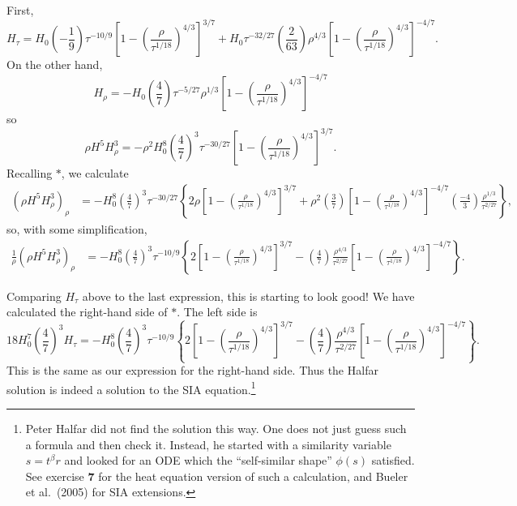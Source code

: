 \documentclass[10pt]{amsart}
\begin{document}
First,
    $$H_\tau = H_0 \left(-\frac{1}{9}\right) \tau^{-10/9} \left[1 - \left( \frac{\rho}{\tau^{1/18}} \right)^{4/3}\right]^{3/7} + H_0 \tau^{-32/27} \left(\frac{2}{63}\right) \rho^{4/3}  \left[1 - \left( \frac{\rho}{\tau^{1/18}} \right)^{4/3}\right]^{-4/7}.$$
On the other hand,
    $$H_\rho = - H_0 \left(\frac{4}{7}\right) \tau^{-5/27} \rho^{1/3} \left[1 - \left( \frac{\rho}{\tau^{1/18}} \right)^{4/3}\right]^{-4/7}$$
so
    $$\rho H^5 H_\rho^3 = -\rho^2 H_0^8 \left(\frac{4}{7}\right)^3 \tau^{-30/27} \left[1 - \left( \frac{\rho}{\tau^{1/18}} \right)^{4/3}\right]^{3/7}.$$
Recalling $\ast$, we calculate
\begin{align*}
\left(\rho H^5 H_\rho^3\right)_\rho &= - H_0^8 \left(\frac{4}{7}\right)^3 \tau^{-30/27} \left\{2 \rho \left[1 - \left( \frac{\rho}{\tau^{1/18}} \right)^{4/3}\right]^{3/7} + \rho^2 \left(\frac{3}{7}\right) \left[1 - \left( \frac{\rho}{\tau^{1/18}} \right)^{4/3}\right]^{-4/7}  \left(\frac{-4}{3}\right) \frac{\rho^{1/3}}{\tau^{2/27}}\right\},
\end{align*}
so, with some simplification,
\begin{align*}
\frac{1}{\rho} \left(\rho H^5 H_\rho^3\right)_\rho &= - H_0^8 \left(\frac{4}{7}\right)^3 \tau^{-10/9} \left\{ 2 \left[1 - \left( \frac{\rho}{\tau^{1/18}} \right)^{4/3}\right]^{3/7} - \left(\frac{4}{7}\right) \frac{\rho^{4/3}}{\tau^{2/27}} \left[1 - \left( \frac{\rho}{\tau^{1/18}} \right)^{4/3}\right]^{-4/7} \right\}.
\end{align*}

Comparing $H_\tau$ above to the last expression, this is starting to look good!  We have calculated the right-hand side of $\ast$.  The left side is
    $$18 H_0^7 \left(\frac{4}{7}\right)^3 H_\tau = - H_0^8 \left(\frac{4}{7}\right)^3 \tau^{-10/9} \left\{ 2 \left[1 - \left( \frac{\rho}{\tau^{1/18}} \right)^{4/3}\right]^{3/7} - \left(\frac{4}{7}\right) \frac{\rho^{4/3}}{\tau^{2/27}} \left[1 - \left( \frac{\rho}{\tau^{1/18}} \right)^{4/3}\right]^{-4/7} \right\}.$$
This is the same as our expression for the right-hand side.  Thus the Halfar solution is indeed a solution to the SIA equation.\footnote{Peter Halfar did not find the solution this way.  One does not just guess such a formula and then check it.  Instead, he started with a similarity variable $s = t^\beta r$ and looked for an ODE which the ``self-similar shape'' $\phi(s)$ satisfied.  See exercise \textbf{7} for the heat equation version of such a calculation, and Bueler et al.~(2005) for SIA extensions.}
\end{document}
